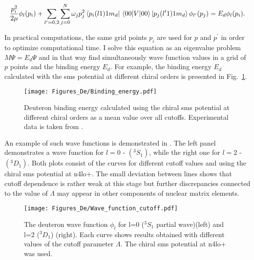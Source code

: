     
    \begin{equation}
        \frac{p_i^2}{2\mu} \phi_l(p_i) +
        \sum_{l^\prime =0,2}\sum_{j =0}^{N}  \omega_j p^{2}_j 
        \bra{p_i(l1)1m_d} \matrixel{00}{V}{00} \ket{p_j(l^\prime1)1m_d}
        \phi_{l^\prime}(p_j) = 
        E_d \phi_l(p_i).
        \label{integral2}
    \end{equation}

    In practical computations, the same grid points $p_i$ are used for $p$ and $p^\prime$ in order to
    optimize computational time. 
    I solve this equation as an eigenvalue problem $M\Psi = E_d \Psi$ and
    in that way
    find simultaneously wave function values in a grid of $p$ points and the binding energy $E_d$. 
    For example, the binding energy $E_d$ calculated with the \gls{sms} potential at different chiral orders 
    is presented in Fig.~\ref{bind}.

    \begin{figure}[h]
        \begin{center}
            \texttt{[image: Figures\_De/Binding\_energy.pdf]}
        \end{center}
        \caption{Deuteron binding energy calculated using the chiral \gls{sms} potential
        at different chiral orders as a mean value over all cutoffs.
        Experimental data is taken from \cite{VANDERLEUN1982261}.}
        \label{bind}
    \end{figure}

    An example of such wave functions is demonstrated in . The left panel demonstrates
    a wave function for $l=0$ - $(^3S_1)$, while the right one for $l=2$ - $(^3D_1)$. Both 
    plots consist of the curves for different cutoff values and using the chiral \gls{sms} potential at \gls{n4lo+}.
    The small deviation between lines shows that cutoff dependence is rather weak at this stage
    but further discrepancies connected to the value of $\Lambda$ may appear in other components
    of nuclear matrix elements.  

    \begin{figure}[h]
        \begin{center}
            \texttt{[image: Figures\_De/Wave\_function\_cutoff.pdf]}
        \end{center}
        \caption{The deuteron wave function $\phi_l$ for l=0 ($^3S_1$ partial wave)(left) and l=2 ($^3D_1$) (right).
        Each curve shows results obtained with different values of the cutoff parameter $\Lambda$. 
        The chiral \gls{sms} potential at \gls{n4lo+} was used.}
        \label{wave_func}
    \end{figure}

